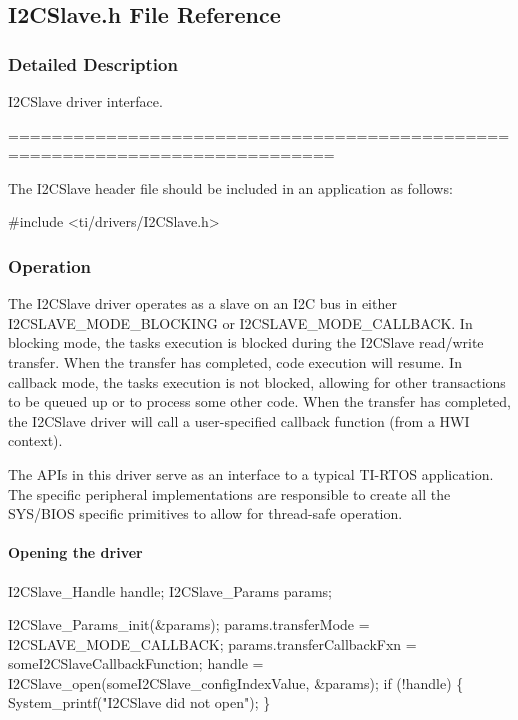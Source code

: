 \subsection{I2\+C\+Slave.\+h File Reference}
\label{_i2_c_slave_8h}


\subsubsection{Detailed Description}
I2\+C\+Slave driver interface. 

============================================================================

The I2\+C\+Slave header file should be included in an application as follows\+: 
\begin{DoxyCode}
\textcolor{preprocessor}{#include <ti/drivers/I2CSlave.h>}
\end{DoxyCode}


\subsubsection*{Operation}

The I2\+C\+Slave driver operates as a slave on an I2\+C bus in either I2\+C\+S\+L\+A\+V\+E\+\_\+\+M\+O\+D\+E\+\_\+\+B\+L\+O\+C\+K\+I\+N\+G or I2\+C\+S\+L\+A\+V\+E\+\_\+\+M\+O\+D\+E\+\_\+\+C\+A\+L\+L\+B\+A\+C\+K. In blocking mode, the task\textquotesingle{}s execution is blocked during the I2\+C\+Slave read/write transfer. When the transfer has completed, code execution will resume. In callback mode, the task\textquotesingle{}s execution is not blocked, allowing for other transactions to be queued up or to process some other code. When the transfer has completed, the I2\+C\+Slave driver will call a user-\/specified callback function (from a H\+W\+I context).

The A\+P\+Is in this driver serve as an interface to a typical T\+I-\/\+R\+T\+O\+S application. The specific peripheral implementations are responsible to create all the S\+Y\+S/\+B\+I\+O\+S specific primitives to allow for thread-\/safe operation.

\paragraph*{Opening the driver}


\begin{DoxyCode}
I2CSlave_Handle      handle;
I2CSlave_Params      params;

I2CSlave_Params_init(&params);
params.transferMode  = I2CSLAVE_MODE_CALLBACK;
params.transferCallbackFxn = someI2CSlaveCallbackFunction;
handle = I2CSlave_open(someI2CSlave\_configIndexValue, &params);
\textcolor{keywordflow}{if} (!handle) \{
    System\_printf(\textcolor{stringliteral}{"I2CSlave did not open"});
\}
\end{DoxyCode}


